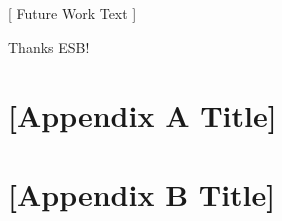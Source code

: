 \documentclass[12pt]{article}
\begin{document}
[ Future Work Text ]






\clearpage



Thanks ESB!
\clearpage



\printbibliography[
    heading=bibintoc, %
    title={\centering References}, %
    ]
\clearpage



\ESBappendix %

\section{[Appendix A Title]}
\label{appendix:name1}

\clearpage




\section{[Appendix B Title]}
\label{appendix:name2}

\clearpage




\end{document}
